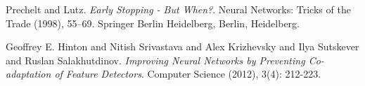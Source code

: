 \documentclass{article}
\begin{document}
\begin{thebibliography}{9}
 Prechelt and Lutz. \textit{Early Stopping - But When?}. Neural Networks: Tricks of the Trade (1998), 55--69. Springer Berlin Heidelberg, Berlin, Heidelberg.

 Geoffrey E. Hinton and Nitish Srivastava and Alex Krizhevsky and Ilya Sutskever and Ruslan Salakhutdinov. \textit{Improving Neural Networks by Preventing Co-adaptation of Feature Detectors}. Computer Science (2012), 3(4): 212-223. 



\end{thebibliography}
\end{document}
